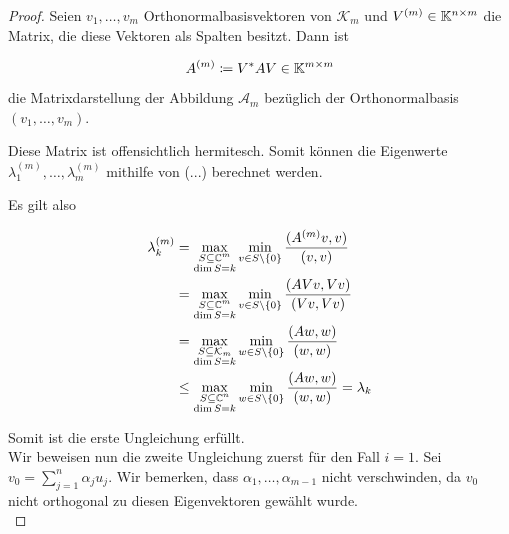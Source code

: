 \documentclass{article}
\begin{document}
\begin{theorem}
\begin{proof}
	Seien $v_1, \dots, v_m$ Orthonormalbasisvektoren von $\mathcal{K}_m$ und $V^{(m)} \in \mathbb{K}^{n\times m}$ die Matrix, die diese Vektoren als Spalten besitzt. Dann ist

	\begin{equation*}
		A^{(m)} \coloneqq V^* A V \in \mathbb{K}^{m\times m}
	\end{equation*}

	die Matrixdarstellung der Abbildung $\mathcal{A}_m$ bezüglich der Orthonormalbasis $(v_1,\dots,v_m)$.

	Diese Matrix ist offensichtlich hermitesch. Somit können die Eigenwerte $\lambda_1^{(m)}, \dots, \lambda_m^{(m)}$ mithilfe von (...) berechnet werden.

	Es gilt also

	\begin{equation}
		\label{Eigenwert_Ungl}
		\begin{aligned}
			\lambda_k^{(m)} &= \max_{\substack{S \subseteq \mathbb{C}^m\\ \dim S = k}} \min_{v\in S\setminus\{0\}} \frac{(A^{(m)}v,v)}{(v,v)} \\
			&= \max_{\substack{S \subseteq \mathbb{C}^m\\ \dim S = k}} \min_{v\in S\setminus\{0\}} \frac{(AVv,Vv)}{(Vv,Vv)}\\
			&= \max_{\substack{S \subseteq \mathcal{K}_m\\ \dim S = k}} \min_{w\in S\setminus\{0\}} \frac{(Aw,w)}{(w,w)}\\
			 &\le \max_{\substack{S \subseteq \mathbb{C}^n\\ \dim S = k}} \min_{w\in S\setminus\{0\}} \frac{(Aw,w)}{(w,w)} = \lambda_k
		\end{aligned}
	\end{equation}

	Somit ist die erste Ungleichung erfüllt.\\

	Wir beweisen nun die zweite Ungleichung zuerst für den Fall $i = 1$.
	Sei $v_0 = \sum_{j=1}^{n}\alpha_j u_j$. Wir bemerken, dass $\alpha_1, \dots, \alpha_{m-1}$ nicht verschwinden, da $v_0$ nicht orthogonal zu diesen Eigenvektoren gewählt wurde.\\


\end{proof}
\end{theorem}
\end{document}
